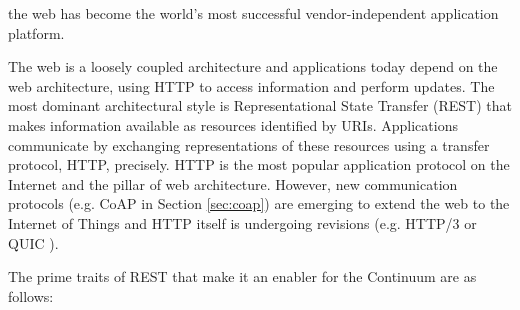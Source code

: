 
the web has become the world's most successful vendor-independent application platform.

The web is a loosely coupled architecture and applications today depend on the web architecture, using HTTP to access information and perform updates. The most dominant architectural style is Representational State Transfer (REST) \cite{rest} that makes information available as resources identified by URIs. Applications communicate by exchanging representations of these resources using a transfer protocol, HTTP, precisely. HTTP is the most popular application protocol on the Internet and the pillar of web architecture. However, new communication protocols (e.g. CoAP in Section \ref{sec:coap}) are emerging to extend the web to the Internet of Things and HTTP itself is undergoing revisions (e.g. HTTP/3 or QUIC \cite{langley2017quic}).

The prime traits of REST that make it an enabler for the Continuum are as follows:

